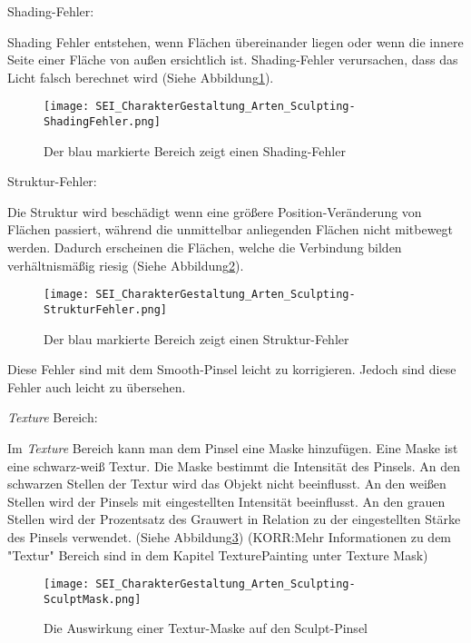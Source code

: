 Shading-Fehler:

Shading Fehler entstehen, wenn Flächen übereinander liegen oder wenn
die innere Seite einer Fläche von außen ersichtlich ist. Shading-Fehler
verursachen, dass das Licht falsch berechnet wird (Siehe Abbildung\ref{picture:shading_fehler}).

\begin{figure}[H]
    \centering
    \texttt{[image: SEI\_CharakterGestaltung\_Arten\_Sculpting-ShadingFehler.png]}
    \caption{Der blau markierte Bereich zeigt einen Shading-Fehler}
    \label{picture:shading_fehler}
\end{figure}


Struktur-Fehler:

Die Struktur wird beschädigt wenn eine größere Position-Veränderung von Flächen passiert, während die unmittelbar
anliegenden Flächen nicht mitbewegt werden. Dadurch erscheinen die Flächen, welche die Verbindung bilden
verhältnismäßig riesig (Siehe Abbildung\ref{picture:struktur_fehler}).

\begin{figure}[H]
    \centering
    \texttt{[image: SEI\_CharakterGestaltung\_Arten\_Sculpting-StrukturFehler.png]}
    \caption{Der blau markierte Bereich zeigt einen Struktur-Fehler}
    \label{picture:struktur_fehler}
\end{figure}



Diese Fehler sind mit dem Smooth-Pinsel leicht zu korrigieren.
Jedoch sind diese Fehler auch leicht zu übersehen.


\textit{Texture} Bereich\citep{blender:tex_mask}:

Im \textit{Texture} Bereich kann man dem Pinsel eine Maske hinzufügen. Eine Maske ist eine schwarz-weiß Textur.
Die Maske bestimmt die Intensität des Pinsels. An den schwarzen Stellen der Textur wird das Objekt nicht
beeinflusst. An den weißen Stellen wird der Pinsels mit eingestellten Intensität beeinflusst.
An den grauen Stellen wird der Prozentsatz des Grauwert in Relation zu der eingestellten
Stärke des Pinsels verwendet. (Siehe Abbildung\ref{picture:sculpt_tex_mask})
(KORR:Mehr Informationen zu dem "Textur" Bereich sind in dem Kapitel TexturePainting unter Texture Mask)

\begin{figure}[H]
    \centering
    \texttt{[image: SEI\_CharakterGestaltung\_Arten\_Sculpting-SculptMask.png]}
    \caption{Die Auswirkung einer Textur-Maske auf den Sculpt-Pinsel}
    \label{picture:sculpt_tex_mask}
\end{figure}

